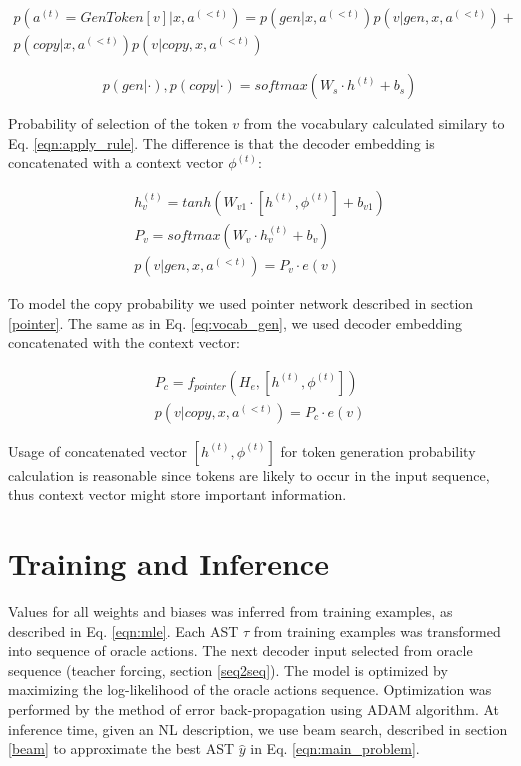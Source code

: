 \begin{equation}
\begin{gathered}
    p(a^{(t)} = GenToken[v]|x,a^{(<t)}) = p(gen|x, a^{(<t)}) p(v|gen, x, a^{(<t)}) + \\
    p(copy|x, a^{(<t)}) p(v|copy, x, a^{(<t)})
\end{gathered}
\end{equation}

\begin{equation}
    p(gen|\cdot), p(copy|\cdot) = softmax(W_s\cdot h^{(t)} + b_s)
\end{equation}

Probability of selection of the token $v$ from the vocabulary calculated similary to Eq. \ref{eqn:apply_rule}. The difference is that the decoder embedding is concatenated with a context vector $\phi^{(t)}$:

\begin{equation}
\begin{gathered}
    h^{(t)}_v = tanh(W _{v1}\cdot [h^{(t)}, \phi^{(t)}] + b_{v1}) \\
    P_v = softmax(W_v\cdot h^{(t)}_v  + b_v) \\
    p(v|gen, x, a^{(<t)}) = P_v\cdot e(v)
\end{gathered}
\label{eq:vocab_gen}
\end{equation}

To model the copy probability we used pointer network \parencite{Vinyals2015} described in section \ref{pointer}. The same as in Eq. \ref{eq:vocab_gen}, we used decoder embedding concatenated with the context vector:

\begin{equation}
\begin{gathered}
    P_c = f_{pointer}(H_e, [h^{(t)}, \phi^{(t)}]) \\
    p(v|copy, x, a^{(<t)}) = P_c \cdot e(v)
\end{gathered}
\end{equation}

Usage of concatenated vector $[h^{(t)}, \phi^{(t)}]$ for token generation probability calculation is reasonable since tokens are likely to occur in the input sequence, thus context vector might store important information.

\section{Training and Inference}

Values for all weights and biases was inferred from training examples, as described in Eq. \ref{eqn:mle}. Each AST $\tau$ from training examples was transformed into sequence of oracle actions. The next decoder input selected from oracle sequence (teacher forcing, section \ref{seq2seq}). The model is optimized by maximizing the log-likelihood of the oracle actions sequence. Optimization was performed by the method of error back-propagation using ADAM \parencite{Kingma2014} algorithm. At inference time, given an NL description, we use beam search, described in section \ref{beam} to approximate the best AST $\hat{y}$ in Eq. \ref{eqn:main_problem}.



